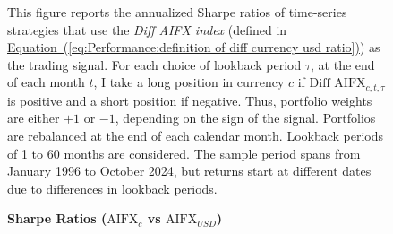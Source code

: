 \documentclass[12pt,oneside,letter]{article}
\newcommand*{\myeq}[1]{\hyperref[{#1}]{Equation~(\ref*{#1})}}
\begin{document}
\begin{appendices}
\begin{landscape}
\begin{figure}
    \begin{small}
     This figure reports the annualized Sharpe ratios of time-series strategies that use the \textit{Diff AIFX index} (defined in \myeq{eq:Performance:definition of diff currency usd ratio}) as the trading signal. For each choice of lookback period \(\tau\), at  the end of each month \(t\), I take a long position in currency \(c\) if \(\text{Diff AIFX}_{c,t,\tau}\) is positive and a short position if negative. Thus, portfolio weights are either \(+1\) or \(-1\), depending on the sign of the signal. Portfolios are rebalanced at the end of each calendar month. Lookback periods of 1 to 60 months are considered. The sample period spans from January 1996 to October 2024, but returns start at different dates due to differences in lookback periods.
    \end{small}


	\end{figure}

\end{landscape}


		\begin{landscape}
	
	\begin{figure}

    \begin{center}
    \caption{\bf Sharpe Ratios (\(\text{AIFX}_{c}\) vs \(\text{AIFX}_{USD}\))}
\end{center}
\end{figure}
\end{landscape}
\end{appendices}
\end{document}
